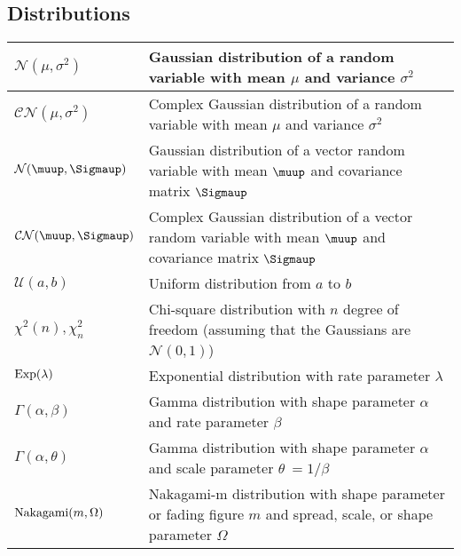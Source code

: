 \documentclass{article}
\begin{document}
\subsection{Distributions}
\begin{xltabular}{\textwidth}{XX}
	\(\mathcal{N}(\mu, \sigma^2)\)                              & Gaussian distribution of a random variable with mean \(\mu\) and variance \(\sigma^{2}\)                                                   \\ \hline
	\(\mathcal{CN}(\mu, \sigma^2)\)                             & Complex Gaussian distribution of a random variable with mean \(\mu\) and variance \(\sigma^{2}\)                                           \\ \hline
	\(\mathcal{N}(\boldsymbol{\muup}, \boldsymbol{\Sigmaup})\)  & Gaussian distribution of a vector random variable with mean \(\boldsymbol{\muup}\) and covariance matrix \(\boldsymbol{\Sigmaup}\)         \\ \hline
	\(\mathcal{CN}(\boldsymbol{\muup}, \boldsymbol{\Sigmaup})\) & Complex Gaussian distribution of a vector random variable with mean \(\boldsymbol{\muup}\) and covariance matrix \(\boldsymbol{\Sigmaup}\) \\ \hline
	\(\mathcal{U}(a,b)\)                                        & Uniform distribution from \(a\) to \(b\)                                                                                                   \\ \hline
	\(\chi^2 (n), \chi^2_n\)                                    & Chi-square distribution with \(n\) degree of freedom (assuming that the Gaussians are \(\mathcal{N}(0,1)\))                                \\ \hline
	\(\textnormal{Exp}(\lambda)\)                               & Exponential distribution with rate parameter \(\lambda\)                                                                                   \\ \hline
	\(\Gamma(\alpha, \beta)\)                                   & Gamma distribution with shape parameter \(\alpha\) and rate parameter \(\beta\)                                                            \\ \hline
	\(\Gamma(\alpha, \theta)\)                                  & Gamma distribution with shape parameter \(\alpha\) and scale parameter \(\theta\ = 1/\beta\)                                               \\ \hline
	\(\textnormal{Nakagami}(m, \Omega)\)                        & Nakagami-m distribution with shape parameter or fading figure \(m\) and spread, scale, or shape parameter \(\Omega\)                       \\ \hline

\end{xltabular}
\end{document}
